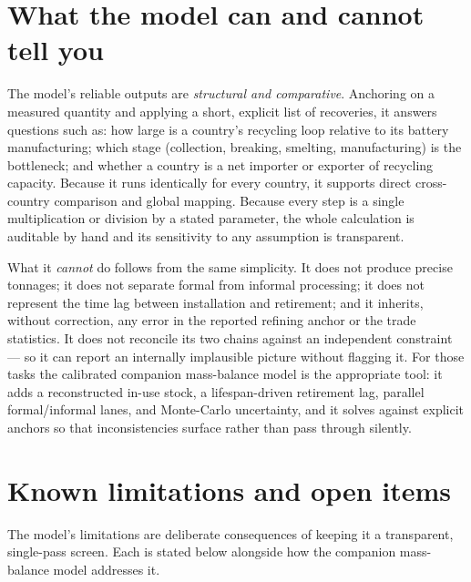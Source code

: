 \documentclass[11pt,a4paper]{article}
\begin{document}
\section{What the model can and cannot tell you}
\label{sec:cannot}

The model's reliable outputs are \emph{structural and comparative}. Anchoring on a
measured quantity and applying a short, explicit list of recoveries, it answers
questions such as: how large is a country's recycling loop relative to its battery
manufacturing; which stage (collection, breaking, smelting, manufacturing) is the
bottleneck; and whether a country is a net importer or exporter of recycling capacity.
Because it runs identically for every country, it supports direct cross-country
comparison and global mapping. Because every step is a single multiplication or
division by a stated parameter, the whole calculation is auditable by hand and its
sensitivity to any assumption is transparent.

What it \emph{cannot} do follows from the same simplicity. It does not produce precise
tonnages; it does not separate formal from informal processing; it does not represent
the time lag between installation and retirement; and it inherits, without correction,
any error in the reported refining anchor or the trade statistics. It does not reconcile
its two chains against an independent constraint --- so it can report an internally
implausible picture without flagging it. For those tasks the calibrated companion
mass-balance model is the appropriate tool: it adds a reconstructed in-use stock, a
lifespan-driven retirement lag, parallel formal/informal lanes, and Monte-Carlo
uncertainty, and it solves against explicit anchors so that inconsistencies surface
rather than pass through silently.

\section{Known limitations and open items}
\label{sec:limits}

The model's limitations are deliberate consequences of keeping it a transparent,
single-pass screen. Each is stated below alongside how the companion mass-balance model
addresses it.
\end{document}
